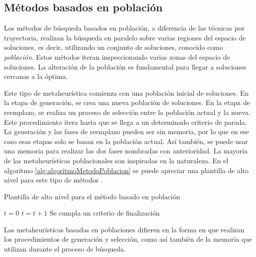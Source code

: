 \subsection{Métodos basados en población}

Los métodos de búsqueda basados en población, a diferencia de las técnicas por trayectoria, realizan la búsqueda en paralelo sobre varias regiones del espacio de soluciones, es decir, utilizando un conjunto de soluciones, conocido como \textit{población}. Estos métodos iteran inspeccionando varias zonas del espacio de soluciones. La alteración de la población es fundamental para llegar a soluciones cercanas a la óptima.


Este tipo de metaheurística comienza con una población inicial de soluciones. En la etapa de generación, se crea una nueva población de soluciones. En la etapa de reemplazo, se realiza un proceso de selección entre la población actual y la nueva. Este procedimiento itera hasta que se llega a un determinado criterio de parada. La generación y las fases de reemplazo pueden ser sin memoria, por lo que en ese caso esas etapas solo se basan en la población actual. Así también, se puede usar una memoria para realizar las dos fases nombradas con anterioridad. La mayoría de las metaheurísticas poblacionales son inspiradas en la naturaleza. En el algoritmo \ref{alg:algoritmoMetodoPoblacion} se puede apreciar una plantilla de alto nivel para este tipo de métodos \cite{TalbiLibro}.

\begin{algorithm} [H]
    \caption{Plantilla de alto nivel para el método basado en población} 
    \label{alg:algoritmoMetodoPoblacion} 
    \begin{algorithmic} [1]
        \State $t=0$
        \Repeat
            \State $t=t+1$
        \Until Se cumpla un criterio de finalización
    \end{algorithmic}
\end{algorithm}

Las metaheurísticas basadas en poblaciones difieren en la forma en que realizan los procedimientos de generación y selección, como así también de la memoria que utilizan durante el proceso de búsqueda.

